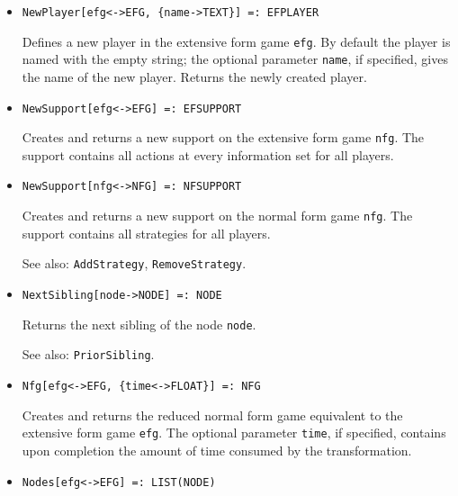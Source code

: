 \begin{itemize}
\item
\protect \large \begin{verbatim}
NewPlayer[efg<->EFG, {name->TEXT}] =: EFPLAYER 
\end{verbatim}\normalsize

\bd
Defines a new player in the extensive form game \verb+efg+.
By default the player is named with the empty string; the optional parameter
\verb+name+, if specified, gives the name of the new player.  Returns the
newly created player.
\ed

\item
\protect \large \begin{verbatim}
NewSupport[efg<->EFG] =: EFSUPPORT
\end{verbatim}\normalsize

\bd
Creates and returns a new support on the extensive form
game \verb+nfg+.  The support contains all actions at every
information set for all players.
\ed

\item
\protect \large \begin{verbatim}
NewSupport[nfg<->NFG] =: NFSUPPORT
\end{verbatim}\normalsize

\bd
Creates and returns a new support on the normal form
game \verb+nfg+.  The support contains all strategies for all players.
\item
[See also:] {\tt AddStrategy}, {\tt RemoveStrategy}.
\ed

\item
\protect \large \begin{verbatim}
NextSibling[node->NODE] =: NODE
\end{verbatim}\normalsize

\bd
Returns the next sibling of the node \verb+node+.
\item
[See also:] {\tt PriorSibling}.
\ed

\item
\protect \large \begin{verbatim}
Nfg[efg<->EFG, {time<->FLOAT}] =: NFG
\end{verbatim}\normalsize

\bd
Creates and returns the reduced normal form game equivalent
to the extensive form game \verb+efg+.  The optional parameter \verb+time+,
if specified, contains upon completion the amount of time consumed by
the transformation.
\ed

\item
\protect \large \begin{verbatim} 
Nodes[efg<->EFG] =: LIST(NODE)
\end{verbatim}\normalsize


\end{itemize}
